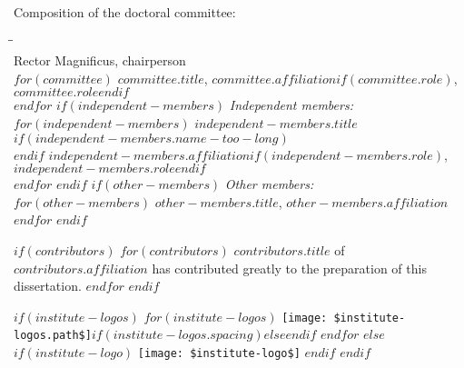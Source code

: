 \begin{titlepage}
    \bigskip
    \noindent Composition of the doctoral committee:
    \begin{tabbing}
        \hspace{\tabcolsep}\=\hspace{0.33\textwidth}\=\hspace{0.66\textwidth}                   \\[-3\medskipamount]
        \> Rector Magnificus,          \> chairperson\\
$for(committee)$
        \> $committee.title$,    \> $committee.affiliation$$if(committee.role)$, \textit{$committee.role$}$endif$    \\
$endfor$
$if(independent-members)$
        \>\textit{Independent members:}                                                        \\[\smallskipamount]
$for(independent-members)$
        \>$independent-members.title$$if(independent-members.name-too-long)$\\
        \>$endif$       \> $independent-members.affiliation$$if(independent-members.role)$, $independent-members.role$$endif$                         \\
$endfor$
$endif$
$if(other-members)$
        \>\textit{Other members:}                                                               \\[\smallskipamount]
$for(other-members)$
        \>$other-members.title$, \> $other-members.affiliation$                         \\
$endfor$
$endif$
    \end{tabbing}

$if(contributors)$
    \medskip
$for(contributors)$
    \noindent $contributors.title$ of $contributors.affiliation$ has contributed greatly to the preparation of this dissertation.
$endfor$
$endif$

    \vfill
        \begin{center}
        $if(institute-logos)$
        $for(institute-logos)$
                \texttt{[image: \$institute-logos.path\$]}$if(institute-logos.spacing)$\hspace{$institute-logos.spacing$}$else$\hspace{1cm}$endif$
        $endfor$
        $else$
        $if(institute-logo)$
                \texttt{[image: \$institute-logo\$]}
        $endif$
        $endif$
        \end{center}
    \vfill


\end{titlepage}
